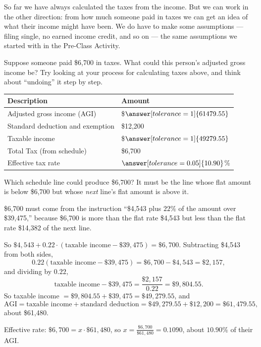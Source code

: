 \documentclass[12pt]{ximera}
\begin{document}
So far we have always calculated the taxes from the income. But we can work in the
other direction: from how much someone paid in taxes we can get an idea of what their
income might have been. We do have to make some assumptions --- filing single, no
earned income credit, and so on --- the same assumptions we started with in the
Pre-Class Activity.

\begin{problem}
Suppose someone paid \$6,700 in taxes. What could this person's adjusted gross income
be? Try looking at your process for calculating taxes above, and think about
``undoing'' it step by step.

\begin{center}
\begin{tabular}{|l|l|}
\hline
Description & Amount \\
\hline
Adjusted gross income (AGI) & \$$\answer[tolerance=1]{61479.55}$ \\
\hline
Standard deduction and exemption & \$12,200 \\
\hline
Taxable income & \$$\answer[tolerance=1]{49279.55}$ \\
\hline
Total Tax (from schedule) & \$6,700 \\
\hline
Effective tax rate & $\answer[tolerance=0.05]{10.90}$\% \\
\hline
\end{tabular}
\end{center}

\begin{hint}
Which schedule line could produce \$6,700? It must be the line whose flat amount is
below \$6,700 but whose \emph{next} line's flat amount is above it.
\end{hint}

\begin{solution}
\$6,700 must come from the instruction ``\$4,543 plus $22\%$ of the amount over
\$39,475,'' because \$6,700 is more than the flat rate \$4,543 but less than the flat
rate \$14,382 of the next line.

So $\$4{,}543 + 0.22 \cdot (\text{taxable income} - \$39{,}475) = \$6{,}700$.
Subtracting \$4,543 from both sides,
\[
0.22 (\text{taxable income} - \$39{,}475) = \$6{,}700 - \$4{,}543 = \$2{,}157,
\]
and dividing by $0.22$,
\[
\text{taxable income} - \$39{,}475 = \frac{\$2{,}157}{0.22} = \$9{,}804.55.
\]
So taxable income $= \$9{,}804.55 + \$39{,}475 = \$49{,}279.55$, and
\[
\text{AGI} = \text{taxable income} + \text{standard deduction}
= \$49{,}279.55 + \$12{,}200 = \$61{,}479.55,
\]
about \$61,480.

Effective rate: $\$6{,}700 = x \cdot \$61{,}480$, so
$x = \frac{\$6{,}700}{\$61{,}480} = 0.1090$, about $10.90\%$ of their AGI.
\end{solution}
\end{problem}
\end{document}
